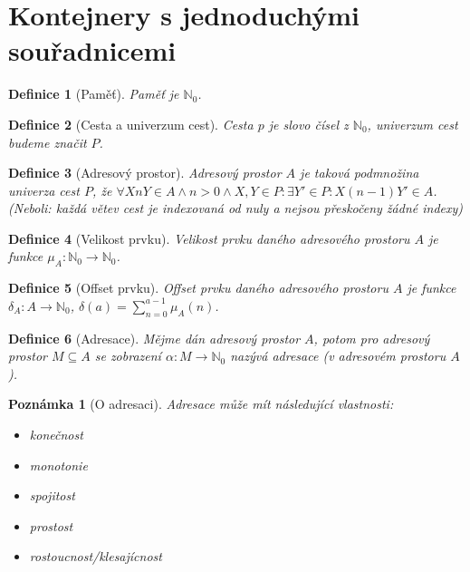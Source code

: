 \documentclass[a4paper,12pt]{article}
\newtheorem{definition}{Definice}[section]
\newtheorem{corollary}{Poznámka}[definition]
\begin{document}
\section{Kontejnery s jednoduchými souřadnicemi}

\begin{definition}[Paměť]
Paměť je $\mathbb{N}_0$.
\end{definition}

\begin{definition}[Cesta a univerzum cest]
Cesta $p$ je slovo čísel z $\mathbb{N}_0$, univerzum cest budeme značit $P$.
\end{definition}

\begin{definition}[Adresový prostor]
Adresový prostor $A$ je taková podmnožina univerza cest $P$, že $\forall X n Y \in A \wedge n > 0 \wedge X,Y \in P: \exists Y' \in P: X (n - 1) Y' \in A$. (Neboli: každá větev cest je indexovaná od nuly a nejsou přeskočeny žádné indexy)
\end{definition}

\begin{definition}[Velikost prvku]
Velikost prvku daného adresového prostoru $A$ je funkce $\mu_A: \mathbb{N}_0 \to \mathbb{N}_0$.
\end{definition}

\begin{definition}[Offset prvku]
Offset prvku daného adresového prostoru $A$ je funkce $\delta_A: A \to \mathbb{N}_0$, $\delta(a) = \sum\limits_{n=0}^{a-1} \mu_A(n)$.
\end{definition}

\begin{definition}[Adresace]
Mějme dán adresový prostor $A$, potom pro adresový prostor $M \subseteq A$ se zobrazení $\alpha: M \to \mathbb{N}_0$ nazývá adresace (v adresovém prostoru $A$).
\end{definition}

\begin{corollary}[O adresaci]
Adresace může mít následující vlastnosti:
\begin{itemize}
    \item konečnost
    \item monotonie
    \item spojitost
    \item prostost
    \item rostoucnost/klesajícnost
\end{itemize}
\end{corollary}
\end{document}
